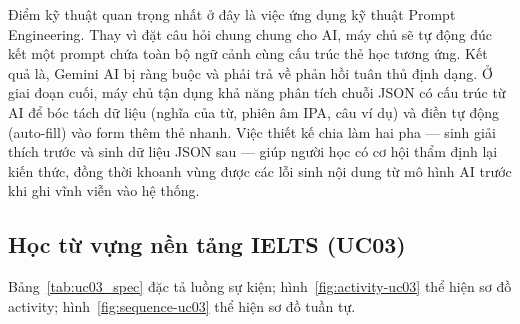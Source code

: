 \begin{sloppypar}
Điểm kỹ thuật quan trọng nhất ở đây là việc ứng dụng kỹ thuật Prompt Engineering. Thay vì đặt câu hỏi chung chung cho AI, máy chủ sẽ tự động đúc kết một prompt chứa toàn bộ ngữ cảnh cùng cấu trúc thẻ học tương ứng. Kết quả là, Gemini AI bị ràng buộc và phải trả về phản hồi tuân thủ định dạng. Ở giai đoạn cuối, máy chủ tận dụng khả năng phân tích chuỗi JSON có cấu trúc từ AI để bóc tách dữ liệu (nghĩa của từ, phiên âm IPA, câu ví dụ) và điền tự động (auto-fill) vào form thêm thẻ nhanh. Việc thiết kế chia làm hai pha --- sinh giải thích trước và sinh dữ liệu JSON sau --- giúp người học có cơ hội thẩm định lại kiến thức, đồng thời khoanh vùng được các lỗi sinh nội dung từ mô hình AI trước khi ghi vĩnh viễn vào hệ thống.
\end{sloppypar}

\subsection{Học từ vựng nền tảng IELTS (UC03)}
Bảng~\ref{tab:uc03_spec} đặc tả luồng sự kiện; hình~\ref{fig:activity-uc03} thể hiện sơ đồ activity; hình~\ref{fig:sequence-uc03} thể hiện sơ đồ tuần tự.
